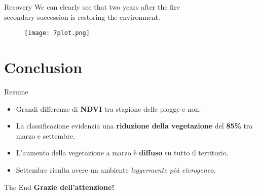 \documentclass{beamer}
\begin{document}
\begin{frame}{Recovery}
\centering
We can clearly see that two years after the fire\\ secondary succession is restoring the environment.
\begin{figure}
     \centering
     \texttt{[image: 7plot.png]}
 \end{figure} 
\end{frame}


\section{Conclusion}

\begin{frame}{Resume}
\begin{itemize}
    \item Grandi differenze di \textbf{NDVI} tra stagione delle piogge e non.
    \bigskip
    \pause \item La classificazione evidenzia una \textbf{riduzione della vegetazione} del \textbf{85\%} tra marzo e settembre.
    \bigskip
    \pause \item L'aumento della vegetazione a marzo è \textbf{diffuso} su tutto il territorio.
    \bigskip
    \pause \item Settembre risulta avere un ambiente \textit{leggermente più eterogeneo}.
\end{itemize}
\end{frame}

\begin{frame}{The End}
\centering
\large \textbf{Grazie dell'attenzione!}
\end{frame}
\end{document}
